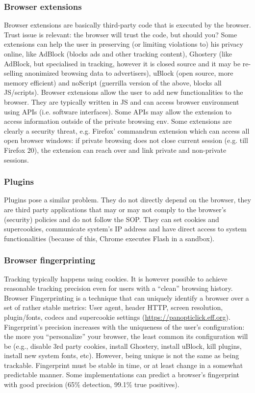 \documentclass[a4paper, 10pt, titlepage]{article}
\begin{document}
\subsubsection*{Browser extensions}
Browser extensions are basically third-party code that is executed by the browser. Trust issue is relevant: the browser will trust the code, but should you? Some extensions can help the user in preserving (or limiting violations to) his privacy online, like AdBlock (blocks ads and other tracking content), Ghostery (like AdBlock, but specialised in tracking, however it is closed source and it may be re-selling anonimized browsing data to advertisers), uBlock (open source, more memory efficient) and noScript (guerrilla version of the above, blocks all JS/scripts). Browser extensions allow the user to add new functionalities to the browser. They are typically written in JS and can access browser environment using APIs (i.e. software interfaces). Some APIs may allow the extension to access information outside of the private browsing env. Some extensions are clearly a security threat, e.g. Firefox’ commandrun extension which can access all open browser windows: if private browsing does not close current session (e.g. till Firefox 20), the extension can reach over and link private and non-private sessions. 

\subsubsection*{Plugins}
Plugins pose a similar problem. They do not directly depend on the browser, they are third party applications that may or may not comply to the browser’s (security) policies and do not follow the SOP. They can set cookies and supercookies, communicate system’s IP address and have direct access to system functionalities (because of this, Chrome executes Flash in a sandbox).

\subsubsection*{Browser fingerprinting}
Tracking typically happens using cookies. It is however possible to achieve reasonable tracking precision even for users with a “clean” browsing history. Browser Fingerprinting is a technique that can uniquely identify a browser over a set of rather stable metrics: User agent, header HTTP, screen resolution, plugin/fonts, codecs and supercookie settings (\url{https://panopticlick.eff.org}).
Fingerprint’s precision increases with the uniqueness of the user’s configuration: the more you “personalize” your browser, the least common its configuration will be (e.g., disable 3rd party cookies, install Ghostery, install uBlock, kill plugins, install new system fonts, etc). However, being unique is not the same as being trackable. Fingerprint must be stable in time, or at least change in a somewhat predictable manner. Some implementations can predict a browser’s fingerprint with good precision (65\% detection, 99.1\% true positives).
\end{document}
